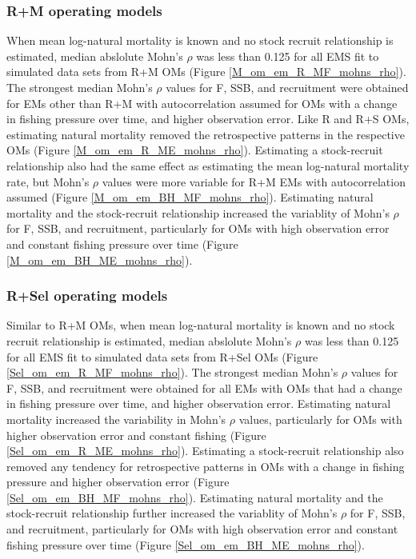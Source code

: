 \documentclass[
  12pt,
]{article}
\begin{document}
\hypertarget{rm-operating-models-4}{%
\subsubsection*{R+M operating models}\label{rm-operating-models-4}}

When mean log-natural mortality is known and no stock recruit
relationship is estimated, median abslolute Mohn's \(\rho\) was less
than 0.125 for all EMS fit to simulated data sets from R+M OMs (Figure
\ref{M_om_em_R_MF_mohns_rho}). The strongest median Mohn's \(\rho\)
values for F, SSB, and recruitment were obtained for EMs other than R+M
with autocorrelation assumed for OMs with a change in fishing pressure
over time, and higher observation error. Like R and R+S OMs, estimating
natural mortality removed the retrospective patterns in the respective
OMs (Figure \ref{M_om_em_R_ME_mohns_rho}). Estimating a stock-recruit
relationship also had the same effect as estimating the mean log-natural
mortality rate, but Mohn's \(\rho\) values were more variable for R+M
EMs with autocorrelation assumed (Figure \ref{M_om_em_BH_MF_mohns_rho}).
Estimating natural mortality and the stock-recruit relationship
increased the variablity of Mohn's \(\rho\) for F, SSB, and recruitment,
particularly for OMs with high observation error and constant fishing
pressure over time (Figure \ref{M_om_em_BH_ME_mohns_rho}).

\hypertarget{rsel-operating-models-4}{%
\subsubsection*{R+Sel operating models}\label{rsel-operating-models-4}}

Similar to R+M OMs, when mean log-natural mortality is known and no
stock recruit relationship is estimated, median abslolute Mohn's
\(\rho\) was less than 0.125 for all EMS fit to simulated data sets from
R+Sel OMs (Figure \ref{Sel_om_em_R_MF_mohns_rho}). The strongest median
Mohn's \(\rho\) values for F, SSB, and recruitment were obtained for all
EMs with OMs that had a change in fishing pressure over time, and higher
observation error. Estimating natural mortality increased the
variability in Mohn's \(\rho\) values, particularly for OMs with higher
observation error and constant fishing (Figure
\ref{Sel_om_em_R_ME_mohns_rho}). Estimating a stock-recruit relationship
also removed any tendency for retrospective patterns in OMs with a
change in fishing pressure and higher observation error (Figure
\ref{Sel_om_em_BH_MF_mohns_rho}). Estimating natural mortality and the
stock-recruit relationship further increased the variablity of Mohn's
\(\rho\) for F, SSB, and recruitment, particularly for OMs with high
observation error and constant fishing pressure over time (Figure
\ref{Sel_om_em_BH_ME_mohns_rho}).
\end{document}
